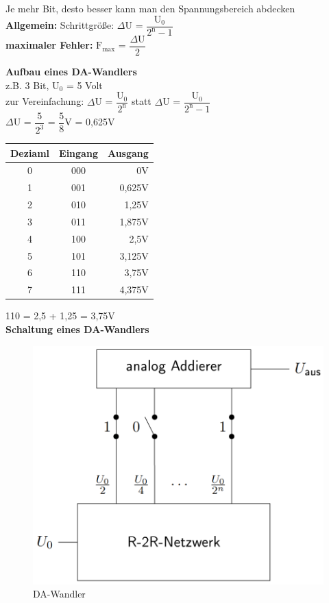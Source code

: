 Je mehr Bit, desto besser kann man den Spannungsbereich abdecken \\

\textbf{Allgemein:} Schrittgröße: $\Delta$U = $\dfrac{\text{U}_0}{2^{\text{n}}-1}$ \\
\textbf{maximaler Fehler:} $\text{F}_{\text{max}}$ = $\dfrac{\Delta \text{U}}{2}$

\textbf{Aufbau eines DA-Wandlers} \\
z.B. 3 Bit, $\text{U}_0$ = 5 Volt \\
zur Vereinfachung: $\Delta$U = $\dfrac{\text{U}_0}{2^{\text{n}}}$ statt $\Delta$U = $\dfrac{\text{U}_0}{2^{\text{n}}-1}$ \\

$\Delta$U = $\dfrac{5}{2^{3}}$ = $\dfrac{5}{8}$V = 0,625V

\begin{tabular}{|c|c|r|}
	\hline
	\textbf{Deziaml} & \textbf{Eingang} & \textbf{Ausgang} \\
	\hline
	0 & 000 & 0V \\ 
	\hline
	1 & 001 & 0,625V \\ 
	\hline
	2 & 010 & 1,25V \\ 
	\hline
	3 & 011 & 1,875V \\ 
	\hline
	4 & 100 & 2,5V \\ 
	\hline
	5 & 101 & 3,125V \\
	\hline
	6 & 110 & 3,75V \\
	\hline
	7 & 111 & 4,375V \\
	\hline
\end{tabular}

110 = 2,5 + 1,25 = 3,75V \\

\textbf{Schaltung eines DA-Wandlers} \\
\begin{figure}[H]
	\centering
	\includegraphics[width=0.8\linewidth]{figures/da_wandler.png}
	\caption{DA-Wandler}
\end{figure}

